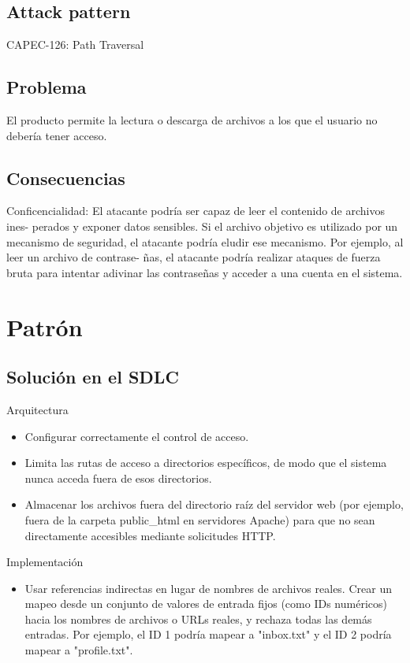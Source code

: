 \subsection*{Attack pattern}
CAPEC-126: Path Traversal
\subsection*{Problema}
El producto permite la lectura o descarga de archivos a los que el usuario no debería tener acceso.
\subsection*{Consecuencias}
Conficencialidad: El atacante podría ser capaz de leer el contenido de archivos ines-
perados y exponer datos sensibles. Si el archivo objetivo es utilizado por un mecanismo de
seguridad, el atacante podría eludir ese mecanismo. Por ejemplo, al leer un archivo de contrase-
ñas, el atacante podría realizar ataques de fuerza bruta para intentar adivinar las contraseñas
y acceder a una cuenta en el sistema.
\section{Patrón}
\subsection*{Solución en el SDLC}

Arquitectura
\begin{itemize}
    \item Configurar correctamente el control de acceso.
    \item Limita las rutas de acceso a directorios específicos, de modo que el sistema nunca acceda fuera de esos directorios.
    \item Almacenar los archivos fuera del directorio raíz del servidor web (por ejemplo, fuera de la carpeta public\_html en servidores Apache) para que no sean directamente accesibles mediante solicitudes HTTP.
\end{itemize}

Implementación
\begin{itemize}
    \item Usar referencias indirectas en lugar de nombres de archivos reales. Crear un mapeo desde un conjunto de valores de entrada fijos (como IDs numéricos) hacia los nombres de archivos o URLs reales, y rechaza todas las demás entradas. Por ejemplo, el ID 1 podría mapear a "inbox.txt" y el ID 2 podría mapear a "profile.txt". 
\end{itemize}

